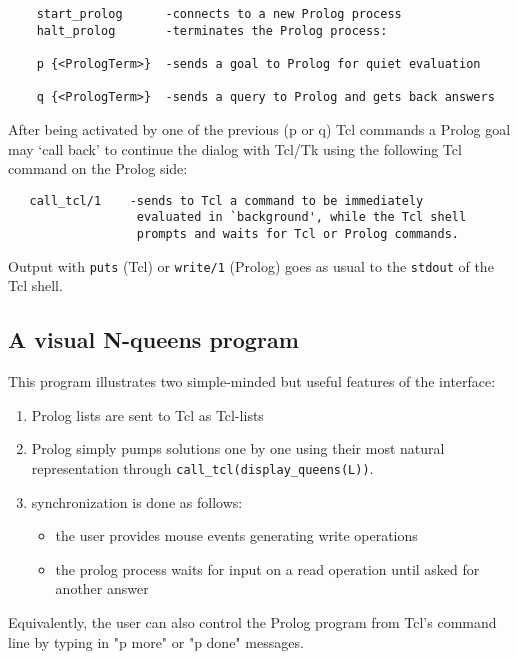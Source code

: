 \documentclass{article}
\begin{document}
{\small \begin{verbatim}
    start_prolog      -connects to a new Prolog process
    halt_prolog       -terminates the Prolog process:   

    p {<PrologTerm>}  -sends a goal to Prolog for quiet evaluation

    q {<PrologTerm>}  -sends a query to Prolog and gets back answers
\end{verbatim}}

{\flushleft After} being activated by one of the previous (p or q) Tcl commands
a Prolog goal may `call back' to continue the dialog with Tcl/Tk using
the following Tcl command on the Prolog side:

{\small \begin{verbatim}
   call_tcl/1    -sends to Tcl a command to be immediately
                  evaluated in `background', while the Tcl shell
                  prompts and waits for Tcl or Prolog commands.
\end{verbatim}}

{\flushleft Output} with {\tt puts} (Tcl) or {\tt write/1}
(Prolog) goes as usual to the {\tt stdout} of the Tcl shell.

\subsection{A visual N-queens program}


This program illustrates two simple-minded but useful features
of the interface:

\begin{enumerate}

\item  Prolog lists are sent to Tcl as Tcl-lists
\item  Prolog simply pumps solutions one by one using their most natural
   representation through \verb~call_tcl(display_queens(L))~.

\item synchronization is done as follows:
\begin{itemize}
\item the user provides mouse events
generating write operations 
\item the prolog process waits for input on a read operation
until asked for another answer
\end{itemize}
\end{enumerate}

Equivalently, the user
can also control the Prolog program from Tcl's command line
by typing in "p more" or "p done" messages.
\end{document}
